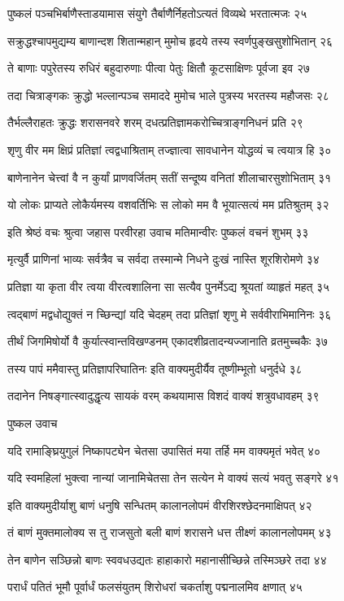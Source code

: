 पुष्कलं पञ्चभिर्बाणैस्ताडयामास संयुगे
तैर्बाणैर्निहतोऽत्यतं विव्यथे भरतात्मजः २५

सक्रुद्धश्चापमुद्यम्य बाणान्दश शितान्महान्
मुमोच हृदये तस्य स्वर्णपुङ्खसुशोभितान् २६

ते बाणाः पपुरेतस्य रुधिरं बहुदारुणाः
पीत्वा पेतुः क्षितौ कूटसाक्षिणः पूर्वजा इव २७

तदा चित्राङ्गकः क्रुद्धो भल्लान्पञ्च समाददे
मुमोच भाले पुत्रस्य भरतस्य महौजसः २८

तैर्भल्लैराहतः क्रुद्धः शरासनवरे शरम्
दधत्प्रतिज्ञामकरोच्चित्राङ्गनिधनं प्रति २९

शृणु वीर मम क्षिप्रं प्रतिज्ञां त्वद्वधाश्रिताम्
तज्ज्ञात्वा सावधानेन योद्धव्यं च त्वयात्र हि ३०

बाणेनानेन चेत्त्वां वै न कुर्यां प्राणवर्जितम्
सतीं सन्दूष्य वनितां शीलाचारसुशोभिताम् ३१

यो लोकः प्राप्यते लोकैर्यमस्य वशवर्तिभिः
स लोको मम वै भूयात्सत्यं मम प्रतिश्रुतम् ३२

इति श्रेष्ठं वचः श्रुत्वा जहास परवीरहा
उवाच मतिमान्वीरः पुष्कलं वचनं शुभम् ३३

मृत्युर्वै प्राणिनां भाव्यः सर्वत्रैव च सर्वदा
तस्मान्मे निधने दुःखं नास्ति शूरशिरोमणे ३४

प्रतिज्ञा या कृता वीर त्वया वीरत्वशालिना
सा सत्यैव पुनर्मेऽद्य श्रूयतां व्याहृतं महत् ३५

त्वद्बाणं मद्वधोद्युक्तं न च्छिन्द्यां यदि चेदहम्
तदा प्रतिज्ञां शृणु मे सर्ववीराभिमानिनः ३६

तीर्थं जिगमिषोर्यो वै कुर्यात्स्वान्तविखण्डनम्
एकादशीव्रतादन्यज्जानाति व्रतमुच्चकैः ३७

तस्य पापं ममैवास्तु प्रतिज्ञापरिघातिनः
इति वाक्यमुदीर्यैव तूष्णीम्भूतो धनुर्दधे ३८

तदानेन निषङ्गात्स्वादुद्धृत्य सायकं वरम्
कथयामास विशदं वाक्यं शत्रुवधावहम् ३९

पुष्कल उवाच

यदि रामाङ्घ्रियुगुलं निष्कापट्येन चेतसा
उपासितं मया तर्हि मम वाक्यमृतं भवेत् ४०

यदि स्वमहिलां भुक्त्वा नान्यां जानामिचेतसा
तेन सत्येन मे वाक्यं सत्यं भवतु सङ्गरे ४१

इति वाक्यमुदीर्याशु बाणं धनुषि सन्धितम्
कालानलोपमं वीरशिरश्छेदनमाक्षिपत् ४२

तं बाणं मुक्तमालोक्य स तु राजसुतो बली
बाणं शरासने धत्त तीक्ष्णं कालानलोपमम् ४३

तेन बाणेन सञ्छिन्नो बाणः स्ववधउद्यतः
हाहाकारो महानासीच्छिन्ने तस्मिञ्छरे तदा ४४

परार्धं पतितं भूमौ पूर्वार्धं फलसंयुतम्
शिरोधरां चकर्ताशु पद्मनालमिव क्षणात् ४५

